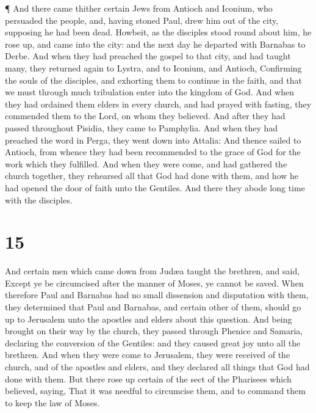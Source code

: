  ¶ And there came thither certain Jews from Antioch and
Iconium, who persuaded the people, and, having stoned Paul, drew him out
of the city, supposing he had been dead.  Howbeit, as the
disciples stood round about him, he rose up, and came into the city: and
the next day he departed with Barnabas to Derbe.  And when
they had preached the gospel to that city, and had taught many, they
returned again to Lystra, and to Iconium, and Antioch, 
Confirming the souls of the disciples, and exhorting them to continue in
the faith, and that we must through much tribulation enter into the
kingdom of God.  And when they had ordained them elders in
every church, and had prayed with fasting, they commended them to the
Lord, on whom they believed.  And after they had passed
throughout Pisidia, they came to Pamphylia.  And when they
had preached the word in Perga, they went down into Attalia:
 And thence sailed to Antioch, from whence they had been
recommended to the grace of God for the work which they fulfilled.
 And when they were come, and had gathered the church
together, they rehearsed all that God had done with them, and how he had
opened the door of faith unto the Gentiles.  And there they
abode long time with the disciples.

\hypertarget{section-14}{%
\section{15}\label{section-14}}

 And certain men which came down from Judæa taught the
brethren, and said, Except ye be circumcised after the manner of Moses,
ye cannot be saved.  When therefore Paul and Barnabas had no
small dissension and disputation with them, they determined that Paul
and Barnabas, and certain other of them, should go up to Jerusalem unto
the apostles and elders about this question.  And being
brought on their way by the church, they passed through Phenice and
Samaria, declaring the conversion of the Gentiles: and they caused great
joy unto all the brethren.  And when they were come to
Jerusalem, they were received of the church, and of the apostles and
elders, and they declared all things that God had done with them.
 But there rose up certain of the sect of the Pharisees
which believed, saying, That it was needful to circumcise them, and to
command them to keep the law of Moses.

